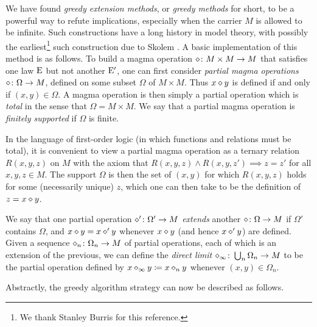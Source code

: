 We have found \emph{greedy extension methods}, or \emph{greedy methods} for short, to be a powerful way to refute implications, especially when the carrier $M$ is allowed to be infinite.  Such constructions have a long history in model theory, with possibly the earliest\footnote{We thank Stanley Burris for this reference.} such construction due to Skolem \cite{skolem}. A basic implementation of this method is as follows.  To build a magma operation $\diamond \colon M \times M \to M$ that satisfies one law $\mathrm{E}$ but not another ${\mathrm{E}'}$, one can first consider \emph{partial magma operations} $\diamond \colon \Omega \to M$, defined on some subset $\Omega$ of $M \times M$. Thus $x \diamond y$ is defined if and only if $(x,y) \in \Omega$. A magma operation is then simply a partial operation which is \emph{total} in the sense that $\Omega = M \times M$.  We say that a partial magma operation is \emph{finitely supported} if $\Omega$ is finite.

In the language of first-order logic (in which functions and relations must be total), it is convenient to view a partial magma operation as a ternary relation $R(x,y,z)$ on $M$ with the axiom that $R(x,y,z) \wedge R(x,y,z') \implies z=z'$ for all $x,y,z \in M$.  The support $\Omega$ is then the set of $(x,y)$ for which $R(x,y,z)$ holds for some (necessarily unique) $z$, which one can then take to be the definition of $z = x \diamond y$.

We say that one partial operation $\diamond' \colon \Omega' \to M$ \emph{extends} another $\diamond \colon \Omega \to M$ if $\Omega'$ contains $\Omega$, and $x \diamond y = x \diamond' y$ whenever $x \diamond y$ (and hence $x \diamond' y$) are defined. Given a sequence $\diamond_n \colon \Omega_n \to M$ of partial operations, each of which is an extension of the previous, we can define the \emph{direct limit} $\diamond_\infty \colon \bigcup_n \Omega_n \to M$ to be the partial operation defined by $x \diamond_\infty y \coloneqq x \diamond_n y$ whenever $(x,y) \in \Omega_n$.

Abstractly, the greedy algorithm strategy can now be described as follows.

